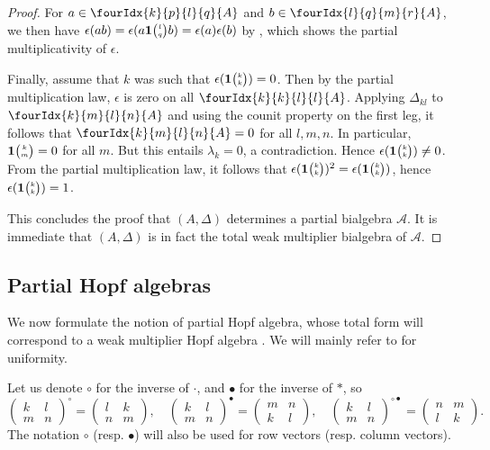 \documentclass[11pt]{article}
\newcommand{\Grt}[3]{#1{\tiny {\begin{pmatrix} #2\\#3\end{pmatrix}}}}
\newcommand{\UnitC}[2]{\Grt{\mathbf{1}}{#1}{#2}}
\newcommand{\Gr}[5]{\fourIdx{#2}{#4}{#3}{#5}{#1}}%
\newcommand{\wmult}{\cdot}
\newcommand{\bmult}{*}
\theoremstyle{definition}
\numberwithin{equation}{section}
\begin{document}
\begin{proof}
For $a\in \Gr{A}{k}{l}{p}{q}$ and $b\in \Gr{A}{l}{m}{q}{r}$, we then have $\epsilon(ab) = \epsilon(a\UnitC{l}{q}b) = \epsilon(a)\epsilon(b)$ by \cite[Proposition 2.6.(4)]{Boh1}, which shows the partial multiplicativity of $\epsilon$. 

Finally, assume that $k$ was such that $\epsilon(\UnitC{k}{k})=0$. Then by the partial multiplication law, $\epsilon$ is zero on all $\Gr{A}{k}{l}{k}{l}$. Applying $\Delta_{kl}$ to $\Gr{A}{k}{l}{m}{n}$ and using the counit property on the first leg, it follows that $\Gr{A}{k}{l}{m}{n}=0$ for all $l,m,n$. In particular, $\UnitC{k}{m}=0$ for all $m$. But this entails $\lambda_k=0$, a contradiction. Hence $\epsilon(\UnitC{k}{k})\neq 0$. From the partial multiplication law, it follows that $\epsilon(\UnitC{k}{k})^2 = \epsilon(\UnitC{k}{k})$, hence $\epsilon(\UnitC{k}{k})=1$.

This concludes the proof that $(A,\Delta)$ determines a partial bialgebra $\mathscr{A}$. It is immediate that $(A,\Delta)$ is in fact the total weak multiplier bialgebra of $\mathscr{A}$. 
\end{proof} 


\subsection{Partial Hopf algebras}

We now formulate the notion of partial Hopf algebra, whose total form will correspond to a weak multiplier Hopf algebra \cite{Boh1,VDW2,VDW1}. We will mainly refer to \cite{Boh1} for uniformity.

 Let us denote $\circ$ for the inverse of $\wmult$, and $\bullet$ for the inverse of $\bmult$, so \[\begin{pmatrix} k & l \\ m & n \end{pmatrix}^{\circ} = \begin{pmatrix} l & k \\ n & m \end{pmatrix},\quad \begin{pmatrix} k & l \\ m & n \end{pmatrix}^{\bullet} = \begin{pmatrix} m & n \\ k & l \end{pmatrix},\quad \begin{pmatrix} k & l \\ m & n \end{pmatrix}^{\circ \bullet} = \begin{pmatrix} n & m \\ l & k \end{pmatrix}.\] The notation $\circ$ (resp. $\bullet$) will also be used for row vectors (resp. column vectors).
\end{document}
